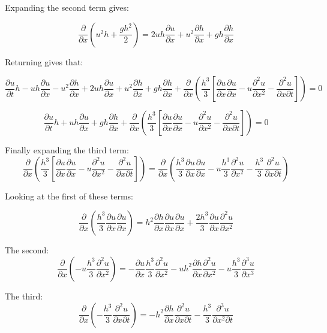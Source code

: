 \documentclass{article}
\begin{document}
Expanding the second term gives:

\[\dfrac{\partial}{\partial x} \left( u^2h + \dfrac{gh^2}{2}\right) = 2uh\frac{\partial u}{\partial x} + u^2\frac{\partial h}{\partial x} + gh\frac{\partial h}{\partial x}\]

Returning gives that:

$$\dfrac{\partial u}{\partial t}h - uh \dfrac{\partial u}{\partial x} -u^2\dfrac{\partial h}{\partial x} + 2uh\frac{\partial u}{\partial x} + u^2\frac{\partial h}{\partial x} + gh\frac{\partial h}{\partial x} + \dfrac{\partial}{\partial x} \left (  \dfrac{h^3}{3} \left [ \dfrac{\partial u }{\partial x} \dfrac{\partial u}{\partial x} - u \dfrac{\partial^2 u}{\partial x^2}  - \dfrac{\partial^2 u}{\partial x \partial t}\right ] \right ) = 0$$

$$\dfrac{\partial u}{\partial t}h + uh\frac{\partial u}{\partial x} + gh\frac{\partial h}{\partial x} + \dfrac{\partial}{\partial x} \left (  \dfrac{h^3}{3} \left [ \dfrac{\partial u }{\partial x} \dfrac{\partial u}{\partial x} - u \dfrac{\partial^2 u}{\partial x^2}  - \dfrac{\partial^2 u}{\partial x \partial t}\right ] \right ) = 0$$

Finally expanding the third term:
\[\dfrac{\partial}{\partial x} \left (  \dfrac{h^3}{3} \left [ \dfrac{\partial u }{\partial x} \dfrac{\partial u}{\partial x} - u \dfrac{\partial^2 u}{\partial x^2}  - \dfrac{\partial^2 u}{\partial x \partial t}\right ] \right ) = \dfrac{\partial}{\partial x} \left(  \dfrac{h^3}{3} \dfrac{\partial u }{\partial x} \dfrac{\partial u}{\partial x} - u\dfrac{h^3}{3} \dfrac{\partial^2 u}{\partial x^2}  - \dfrac{h^3}{3}\dfrac{\partial^2 u}{\partial x \partial t} \right)\]

Looking at the first of these terms:

\[\dfrac{\partial}{\partial x} \left(  \dfrac{h^3}{3} \dfrac{\partial u }{\partial x} \dfrac{\partial u}{\partial x} \right) = h^2 \frac{\partial h}{\partial x} \dfrac{\partial u }{\partial x} \dfrac{\partial u}{\partial x} + \dfrac{2h^3}{3} \dfrac{\partial u }{\partial x} \dfrac{\partial^2 u}{\partial x^2} \]

The second:
\[\dfrac{\partial}{\partial x} \left( - u\dfrac{h^3}{3} \dfrac{\partial^2 u}{\partial x^2} \right) = - \frac{\partial u}{\partial x}\dfrac{h^3}{3} \dfrac{\partial^2 u}{\partial x^2} - uh^2\frac{\partial h}{\partial x}\dfrac{\partial^2 u}{\partial x^2} - u\dfrac{h^3}{3}\dfrac{\partial^3 u}{\partial x^3}  \]

The third:
\[\dfrac{\partial}{\partial x} \left(   - \dfrac{h^3}{3}\dfrac{\partial^2 u}{\partial x \partial t} \right) = - h^2\frac{\partial h}{\partial x}\dfrac{\partial^2 u}{\partial x \partial t}   - \dfrac{h^3}{3}\dfrac{\partial^3 u}{\partial x^2 \partial t}  \]
\end{document}
